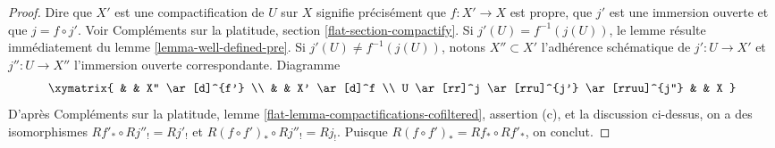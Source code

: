\begin{proof}
Dire que $X'$ est une compactification de $U$ sur $X$ signifie précisément que $f : X' \to X$ est propre, que $j'$ est une immersion ouverte et que $j = f \circ j'$. Voir Compléments sur la platitude, section \ref{flat-section-compactify}. Si $j'(U) = f^{-1}(j(U))$, le lemme résulte immédiatement du lemme \ref{lemma-well-defined-pre}. Si $j'(U) \not = f^{-1}(j(U))$, notons $X'' \subset X'$ l'adhérence schématique de $j' : U \to X'$ et $j'' : U \to X''$ l'immersion ouverte correspondante. Diagramme
$$
\xymatrix{
& & X'' \ar[d]^{f'} \\
& & X' \ar[d]^f \\
U \ar[rr]^j \ar[rru]^{j'} \ar[rruu]^{j''} & & X
}
$$
D'après Compléments sur la platitude, lemme \ref{flat-lemma-compactifications-cofiltered}, assertion (c), et la discussion ci-dessus, on a des isomorphismes $Rf'_* \circ Rj''_! = Rj'_!$ et $R(f \circ f')_* \circ Rj''_! = Rj_!$. Puisque $R(f \circ f')_* = Rf_* \circ Rf'_*$, on conclut.
\end{proof}

